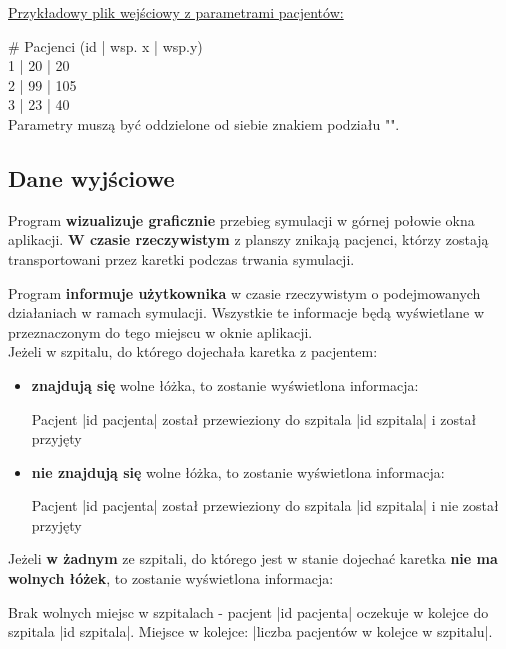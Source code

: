 \documentclass{article}
\begin{document}
    \begin{center}
        \underline{Przykładowy plik wejściowy z parametrami pacjentów:} \\
    \end{center}
    \# Pacjenci (id | wsp. x | wsp.y) \\
    1 | 20 | 20 \\
    2 | 99 | 105 \\
    3 | 23 | 40 \\

    Parametry muszą być oddzielone od siebie znakiem podziału "\textbar".

    \subsection{Dane wyjściowe}
    Program \textbf{wizualizuje graficznie} przebieg symulacji w górnej połowie okna aplikacji. \textbf{W czasie rzeczywistym} z planszy znikają pacjenci, którzy zostają transportowani przez karetki podczas trwania symulacji.

    Program \textbf{informuje użytkownika} w czasie rzeczywistym o podejmowanych działaniach w ramach symulacji. Wszystkie te informacje będą wyświetlane w przeznaczonym do tego miejscu w oknie aplikacji. \\
    Jeżeli w szpitalu, do którego dojechała karetka z pacjentem:
    \begin{itemize}
        \item \textbf{znajdują się} wolne łóżka, to zostanie wyświetlona informacja:
        \begin{center}
            Pacjent |id pacjenta| został przewieziony do szpitala |id szpitala| i został przyjęty
        \end{center}
        \item \textbf{nie znajdują się} wolne łóżka, to zostanie wyświetlona informacja:
        \begin{center}
            Pacjent |id pacjenta| został przewieziony do szpitala |id szpitala| i nie został przyjęty
        \end{center}
    \end{itemize}
    Jeżeli \textbf{w żadnym} ze szpitali, do którego jest w stanie dojechać karetka \textbf{nie ma wolnych łóżek}, to zostanie wyświetlona informacja:
    \begin{center}
        Brak wolnych miejsc w szpitalach - pacjent |id pacjenta| oczekuje w kolejce do szpitala |id szpitala|. Miejsce w kolejce: |liczba pacjentów w kolejce w szpitalu|.
    \end{center}
\end{document}

